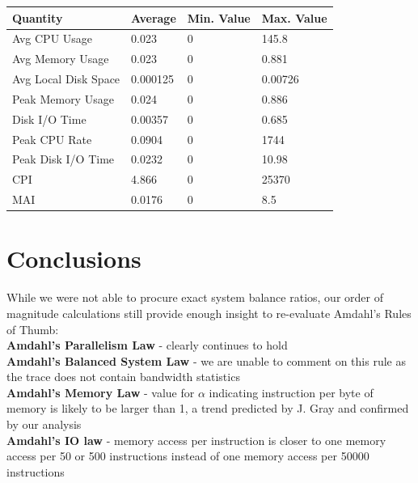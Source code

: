 \documentclass[a0,portrait]{a0poster}
\begin{document}
\begin{multicols}{2}
\begin{center}\vspace{1cm}
\begin{tabular}{| l | l l l |} 
\toprule
\textbf{Quantity} & \textbf{Average} & \textbf{Min. Value} & \textbf{Max. Value} \\
\midrule
Avg CPU Usage & 0.023 & 0 & 145.8 \\ \hline
Avg Memory Usage & 0.023 & 0 & 0.881 \\ \hline
Avg Local Disk Space & 0.000125 & 0 & 0.00726 \\ \hline
Peak Memory Usage & 0.024 & 0 & 0.886 \\ \hline
Disk I/O Time & 0.00357 & 0 & 0.685 \\ \hline
Peak CPU Rate & 0.0904 & 0 & 1744\* \\ \hline
Peak Disk I/O Time & 0.0232 & 0 & 10.98 \\ \hline
CPI & 4.866 & 0 & 25370\* \\ \hline
MAI & 0.0176 & 0 & 8.5\* \\ \hline
\bottomrule
\end{tabular}
\end{center}\vspace{1cm}



\color{SaddleBrown} %

\section*{Conclusions}

While we were not able to procure exact system balance ratios, our order of magnitude calculations still provide enough insight to re-evaluate Amdahl's Rules of Thumb: \\

\noindent \textbf{Amdahl's Parallelism Law} - clearly continues to hold \\
\textbf{Amdahl's Balanced System Law} - we are unable to comment on this rule as the trace does not contain bandwidth statistics\\
\textbf{Amdahl's Memory Law} - value for $\alpha$ indicating instruction per byte of memory is likely to be larger than 1, a trend predicted by J. Gray  and confirmed by our analysis\\
\textbf{Amdahl's IO law} - memory access per instruction is closer to one memory access per 50 or 500 instructions instead of one memory access per 50000 instructions \\


\end{multicols}
\end{document}
